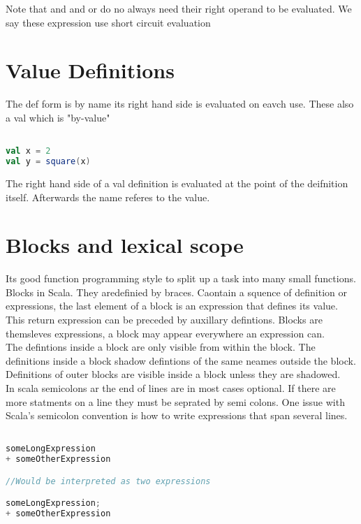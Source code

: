 \documentclass[10pt, a4paper]{report}
\begin{document}
Note that and and or do no always need their right operand to be evaluated. We say these expression use short circuit evaluation

\section{Value Definitions}


The def form is by name its right hand side is evaluated on eavch use. These also a val which is "by-value"

\begin{lstlisting}[language=scala]

val x = 2
val y = square(x)

\end{lstlisting}

The right hand side of a val definition is evaluated at the point of the deifnition itself. Afterwards the name referes to the value.

\section{Blocks and lexical scope}

Its good function programming style to split up a task into many small functions. Blocks in Scala. They aredefinied by braces. Caontain a squence of definition or expressions, the last element of a block is an expression that defines its value. This return expression can be preceded by auxillary defintions. Blocks are themsleves expressions, a block may appear everywhere an expression can.\\

The defintions inside a block are only visible from within the block. The definitions inside a block shadow defintions of the same neames outside the block.\\

Definitions of outer blocks are visible inside a block unless they are shadowed. \\

In scala semicolons ar the end of lines are in most cases optional. If there are more statments on a line they must be seprated by semi colons. One issue with Scala's semicolon convention is how to write expressions that span several lines.

\begin{lstlisting}[language=scala]

someLongExpression
+ someOtherExpression

//Would be interpreted as two expressions 

someLongExpression;
+ someOtherExpression

\end{lstlisting}
\end{document}
